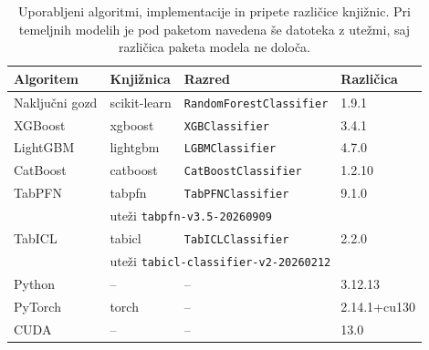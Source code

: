 \begin{table}[htbp]
\centering
\caption{Uporabljeni algoritmi, implementacije in pripete različice knjižnic. Pri temeljnih modelih je pod paketom navedena še datoteka z utežmi, saj različica paketa modela ne določa.}
\label{tab:razlicice}
\small
\begin{tabular}{llll}
\hline
Algoritem & Knjižnica & Razred & Različica \\
\hline
Naključni gozd & scikit-learn & \texttt{RandomForestClassifier} & 1.9.1 \\
XGBoost & xgboost & \texttt{XGBClassifier} & 3.4.1 \\
LightGBM & lightgbm & \texttt{LGBMClassifier} & 4.7.0 \\
CatBoost & catboost & \texttt{CatBoostClassifier} & 1.2.10 \\
TabPFN & tabpfn & \texttt{TabPFNClassifier} & 9.1.0 \\
 & \multicolumn{3}{l}{uteži \texttt{tabpfn-v3.5-20260909}} \\
TabICL & tabicl & \texttt{TabICLClassifier} & 2.2.0 \\
 & \multicolumn{3}{l}{uteži \texttt{tabicl-classifier-v2-20260212}} \\
\hline
Python & -- & -- & 3.12.13 \\
PyTorch & torch & -- & 2.14.1+cu130 \\
CUDA & -- & -- & 13.0 \\
\hline
\end{tabular}
\end{table}
